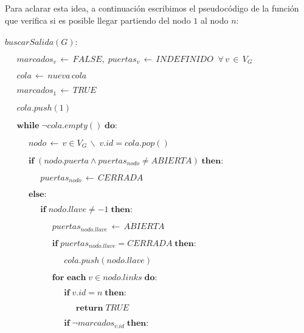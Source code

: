 Para aclarar esta idea, a continuación escribimos el pseudocódigo de la función que verifica si es posible llegar partiendo del nodo $1$ al nodo $n$: \\ \\
$buscarSalida(G):$

$\; \; \; \; \; marcados_v \, \longleftarrow \, FALSE, \; puertas_v \, \longleftarrow \, INDEFINIDO \; \; \forall \, v \, \in \, V_G$

$\; \; \; \; \; cola \, \longleftarrow \, nueva \, cola$

$\; \; \; \; \; marcados_1 \, \longleftarrow \, TRUE$

$\; \; \; \; \; cola.push(1)$

$\; \; \; \; \; \textbf{while} \; \neg cola.empty() \; \textbf{do}:$

$\; \; \; \; \; \; \; \; \; \; nodo \, \longleftarrow \, v \in V_G \, \backslash \; v.id = cola.pop()$

$\; \; \; \; \; \; \; \; \; \; \textbf{if} \; \left( nodo.puerta \wedge puertas_{nodo} \neq ABIERTA \right) \; \textbf{then}:$

$\; \; \; \; \; \; \; \; \; \; \; \; \; \; \; puertas_{nodo} \, \longleftarrow \, CERRADA$

$\; \; \; \; \; \; \; \; \; \; \textbf{else}:$

$\; \; \; \; \; \; \; \; \; \; \; \; \; \; \; \textbf{if} \; nodo.llave \neq -1 \; \textbf{then}:$

$\; \; \; \; \; \; \; \; \; \; \; \; \; \; \; \; \; \; \; \; puertas_{nodo.llave} \, \longleftarrow \, ABIERTA$

$\; \; \; \; \; \; \; \; \; \; \; \; \; \; \; \; \; \; \; \; \textbf{if} \; puertas_{nodo.llave} = CERRADA \; \textbf{then}:$

$\; \; \; \; \; \; \; \; \; \; \; \; \; \; \; \; \; \; \; \; \; \; \; \; \; cola.push(nodo.llave)$

$\; \; \; \; \; \; \; \; \; \; \; \; \; \; \; \; \; \; \; \; \textbf{for each} \; v \in nodo.links \; \textbf{do}:$

$\; \; \; \; \; \; \; \; \; \; \; \; \; \; \; \; \; \; \; \; \; \; \; \; \; \textbf{if} \; v.id = n \; \textbf{then}:$

$\; \; \; \; \; \; \; \; \; \; \; \; \; \; \; \; \; \; \; \; \; \; \; \; \; \; \; \; \; \; \textbf{return} \; TRUE$

$\; \; \; \; \; \; \; \; \; \; \; \; \; \; \; \; \; \; \; \; \; \; \; \; \; \textbf{if} \; \neg marcados_{v.id} \; \textbf{then}:$

